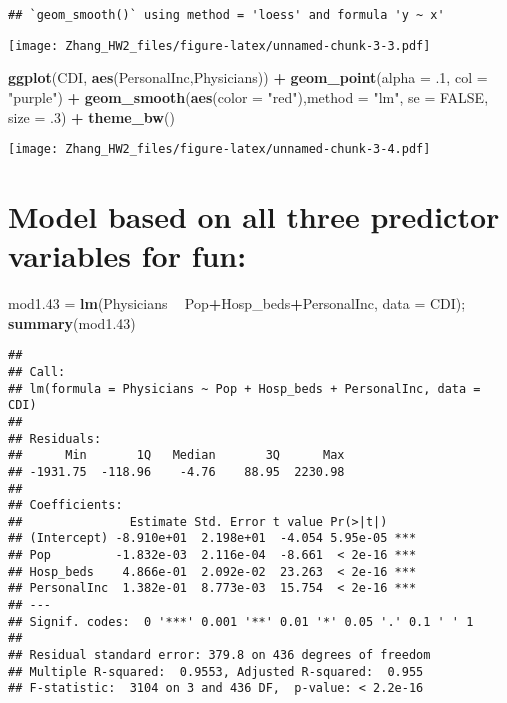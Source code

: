 \documentclass[]{article}
\newenvironment{Shaded}{\begin{snugshade}}{\end{snugshade}}
\newcommand{\DataTypeTok}[1]{\textcolor[rgb]{0.13,0.29,0.53}{#1}}
\newcommand{\FloatTok}[1]{\textcolor[rgb]{0.00,0.00,0.81}{#1}}
\newcommand{\KeywordTok}[1]{\textcolor[rgb]{0.13,0.29,0.53}{\textbf{#1}}}
\newcommand{\NormalTok}[1]{#1}
\newcommand{\OperatorTok}[1]{\textcolor[rgb]{0.81,0.36,0.00}{\textbf{#1}}}
\newcommand{\OtherTok}[1]{\textcolor[rgb]{0.56,0.35,0.01}{#1}}
\newcommand{\StringTok}[1]{\textcolor[rgb]{0.31,0.60,0.02}{#1}}
\begin{document}
\begin{verbatim}
## `geom_smooth()` using method = 'loess' and formula 'y ~ x'
\end{verbatim}

\texttt{[image: Zhang\_HW2\_files/figure-latex/unnamed-chunk-3-3.pdf]}

\begin{Shaded}
\begin{Highlighting}[]
\KeywordTok{ggplot}\NormalTok{(CDI, }\KeywordTok{aes}\NormalTok{(PersonalInc,Physicians)) }\OperatorTok{+}
\StringTok{  }\KeywordTok{geom_point}\NormalTok{(}\DataTypeTok{alpha =} \FloatTok{.1}\NormalTok{, }\DataTypeTok{col =} \StringTok{"purple"}\NormalTok{) }\OperatorTok{+}
\StringTok{  }\KeywordTok{geom_smooth}\NormalTok{(}\KeywordTok{aes}\NormalTok{(}\DataTypeTok{color =} \StringTok{"red"}\NormalTok{),}\DataTypeTok{method =} \StringTok{"lm"}\NormalTok{, }\DataTypeTok{se =} \OtherTok{FALSE}\NormalTok{, }\DataTypeTok{size =} \FloatTok{.3}\NormalTok{) }\OperatorTok{+}\StringTok{ }
\StringTok{  }\KeywordTok{theme_bw}\NormalTok{()}
\end{Highlighting}
\end{Shaded}

\texttt{[image: Zhang\_HW2\_files/figure-latex/unnamed-chunk-3-4.pdf]}

\hypertarget{model-based-on-all-three-predictor-variables-for-fun}{%
\section{Model based on all three predictor variables for
fun:}\label{model-based-on-all-three-predictor-variables-for-fun}}

\begin{Shaded}
\begin{Highlighting}[]
\NormalTok{mod1}\FloatTok{.43}\NormalTok{ =}\StringTok{ }\KeywordTok{lm}\NormalTok{(Physicians }\OperatorTok{~}\StringTok{ }\NormalTok{Pop}\OperatorTok{+}\NormalTok{Hosp_beds}\OperatorTok{+}\NormalTok{PersonalInc, }\DataTypeTok{data =}\NormalTok{ CDI); }\KeywordTok{summary}\NormalTok{(mod1}\FloatTok{.43}\NormalTok{)}
\end{Highlighting}
\end{Shaded}

\begin{verbatim}
## 
## Call:
## lm(formula = Physicians ~ Pop + Hosp_beds + PersonalInc, data = CDI)
## 
## Residuals:
##      Min       1Q   Median       3Q      Max 
## -1931.75  -118.96    -4.76    88.95  2230.98 
## 
## Coefficients:
##               Estimate Std. Error t value Pr(>|t|)    
## (Intercept) -8.910e+01  2.198e+01  -4.054 5.95e-05 ***
## Pop         -1.832e-03  2.116e-04  -8.661  < 2e-16 ***
## Hosp_beds    4.866e-01  2.092e-02  23.263  < 2e-16 ***
## PersonalInc  1.382e-01  8.773e-03  15.754  < 2e-16 ***
## ---
## Signif. codes:  0 '***' 0.001 '**' 0.01 '*' 0.05 '.' 0.1 ' ' 1
## 
## Residual standard error: 379.8 on 436 degrees of freedom
## Multiple R-squared:  0.9553, Adjusted R-squared:  0.955 
## F-statistic:  3104 on 3 and 436 DF,  p-value: < 2.2e-16
\end{verbatim}
\end{document}
